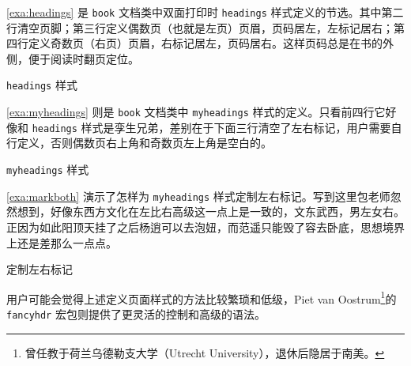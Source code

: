 \autoref{exa:headings} 是 \texttt{book} 文档类中双面打印时 \texttt{headings} 样式定义的节选。其中第二行清空页脚；第三行定义偶数页（也就是左页）页眉，页码居左，左标记居右；第四行定义奇数页（右页）页眉，右标记居左，页码居右。这样页码总是在书的外侧，便于阅读时翻页定位。 

\begin{example}[h]
\begin{Code}[]
\def\ps@headings{%
    \let\@oddfoot\@empty\let\@evenfoot\@empty
    \def\@evenhead{\thepage\hfil\slshape\leftmark}%
    \def\@oddhead{{\slshape\rightmark}\hfil\thepage}%
    ...
\end{Code}
\caption{\texttt{headings} 样式}
\label{exa:headings}
\end{example}

\autoref{exa:myheadings} 则是 \texttt{book} 文档类中 \texttt{myheadings} 样式的定义。只看前四行它好像和 \texttt{headings} 样式是孪生兄弟，差别在于下面三行清空了左右标记，用户需要自行定义，否则偶数页右上角和奇数页左上角是空白的。

\begin{example}[h]
\begin{Code}[]
\def\ps@myheadings{%
    \let\@oddfoot\@empty\let\@evenfoot\@empty
    \def\@evenhead{\thepage\hfil\slshape\leftmark}%
    \def\@oddhead{{\slshape\rightmark}\hfil\thepage}%
    \let\@mkboth\@gobbletwo
    \let\chaptermark\@gobble
    \let\sectionmark\@gobble
}
\end{Code}
\caption{\texttt{myheadings} 样式}
\label{exa:myheadings}
\end{example}

\autoref{exa:markboth} 演示了怎样为 \texttt{myheadings} 样式定制左右标记。写到这里包老师忽然想到，好像东西方文化在左比右高级这一点上是一致的，文东武西，男左女右。正因为如此阳顶天挂了之后杨逍可以去泡妞，而范遥只能毁了容去卧底，思想境界上还是差那么一点点。

\begin{example}[h]
\caption{定制左右标记}
\label{exa:markboth}
\end{example}


用户可能会觉得上述定义页面样式的方法比较繁琐和低级，Piet van Oostrum\footnote{曾任教于荷兰乌德勒支大学（Utrecht University），退休后隐居于南美。}的 \texttt{fancyhdr} 宏包\citep{Oostrum_2004}则提供了更灵活的控制和高级的语法。

